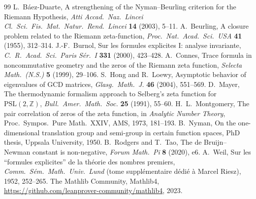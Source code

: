 \documentclass[11pt]{article}
\theoremstyle{remark}
\DeclareRobustCommand{\_}{\ifmmode\text{\textunderscore}\else\textunderscore\allowbreak\fi}
\begin{document}
\begin{thebibliography}{99}
 L.~Báez-Duarte, A strengthening of the Nyman--Beurling criterion for the Riemann Hypothesis, \textit{Atti Accad.\ Naz.\ Lincei Cl.\ Sci.\ Fis.\ Mat.\ Natur.\ Rend.\ Lincei} \textbf{14} (2003), 5--11.
 A.~Beurling, A closure problem related to the Riemann zeta-function, \textit{Proc.\ Nat.\ Acad.\ Sci.\ USA} \textbf{41} (1955), 312--314.
 J.-F.~Burnol, Sur les formules explicites I: analyse invariante, \textit{C.~R.~Acad.\ Sci.\ Paris S\'{e}r.~I} \textbf{331} (2000), 423--428.
 A.~Connes, Trace formula in noncommutative geometry and the zeros of the Riemann zeta function, \textit{Selecta Math.\ (N.S.)} \textbf{5} (1999), 29--106.
 S.~Hong and R.~Loewy, Asymptotic behavior of eigenvalues of GCD matrices, \textit{Glasg.\ Math.\ J.} \textbf{46} (2004), 551--569.
 D.~Mayer, The thermodynamic formalism approach to Selberg's zeta function for $\mathrm{PSL}(2,\mathbb{Z})$, \textit{Bull.\ Amer.\ Math.\ Soc.} \textbf{25} (1991), 55--60.
 H.~L.~Montgomery, The pair correlation of zeros of the zeta function, in \textit{Analytic Number Theory}, Proc.\ Sympos.\ Pure Math.\ XXIV, AMS, 1973, 181--193.
 B.~Nyman, On the one-dimensional translation group and semi-group in certain function spaces, PhD thesis, Uppsala University, 1950.
 B.~Rodgers and T.~Tao, The de Bruijn--Newman constant is non-negative, \textit{Forum Math.\ Pi} \textbf{8} (2020), e6.
 A.~Weil, Sur les ``formules explicites'' de la th\'{e}orie des nombres premiers, \textit{Comm.\ S\'{e}m.\ Math.\ Univ.\ Lund} (tome suppl\'{e}mentaire d\'{e}di\'{e} \`{a} Marcel Riesz), 1952, 252--265.
 The Mathlib Community, Mathlib4, \url{https://github.com/leanprover-community/mathlib4}, 2023.
\end{thebibliography}
\end{document}

